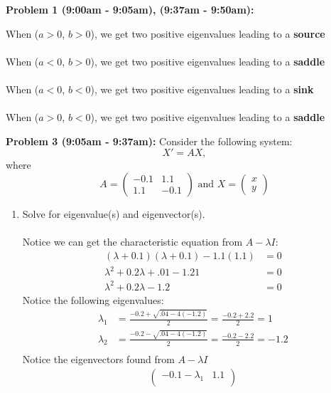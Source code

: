 \documentclass[11pt]{article}
\newenvironment{problem}[1]{\textbf{Problem #1: }}{\newpage}
\begin{document}
\begin{problem}{1 (9:00am - 9:05am), (9:37am - 9:50am)}
\begin{enumerate}[label = (\alph*)]
			When ($a > 0$, $b > 0$), we get two positive eigenvalues leading to a \textbf{source} \\ \\
			When ($a < 0$, $b > 0$), we get two positive eigenvalues leading to a \textbf{saddle} \\ \\
			When ($a < 0$, $b < 0$), we get two positive eigenvalues leading to a \textbf{sink} \\ \\
			When ($a > 0$, $b < 0$), we get two positive eigenvalues leading to a \textbf{saddle} 
		\end{enumerate}
	\end{problem}

	\begin{problem}{3 (9:05am - 9:37am)}
		Consider the following system:
		\[X' = AX, \tag{3.1}\]
		where
		\[A = \begin{pmatrix}
			-0.1 & 1.1 \\
			1.1 & -0.1
		\end{pmatrix} \text{ and } X = \begin{pmatrix}
			x \\ y
		\end{pmatrix}\]
		\begin{enumerate}[label = (\alph*)]
			\item  Solve for eigenvalue(s) and eigenvector(s).
			\\ \\
			Notice we can get the characteristic equation from $A - \lambda I$:
			\begin{align*}
				(\lambda + 0.1)(\lambda + 0.1) - 1.1(1.1) &= 0\\
				\lambda^2 + 0.2\lambda + .01 - 1.21 &= 0 \\
				\lambda^2 + 0.2\lambda - 1.2 &= 0 
			\end{align*}
			Notice the following eigenvalues:
			\begin{align*}
				\lambda_1 &= \frac{-0.2 + \sqrt{.04 - 4(-1.2)}}{2} = \frac{-0.2 + 2.2}{2} = 1 \\
				\lambda_2 &= \frac{-0.2 - \sqrt{.04 - 4(-1.2)}}{2} = \frac{-0.2 - 2.2}{2} = -1.2 \\
			\end{align*}
			Notice the eigenvectors found from $A - \lambda I$ \\
			\begin{align*}
				\begin{pmatrix}
					-0.1 - \lambda_1 & 1.1 \\

\end{pmatrix}
\end{align*}
\end{enumerate}
\end{problem}
\end{document}
